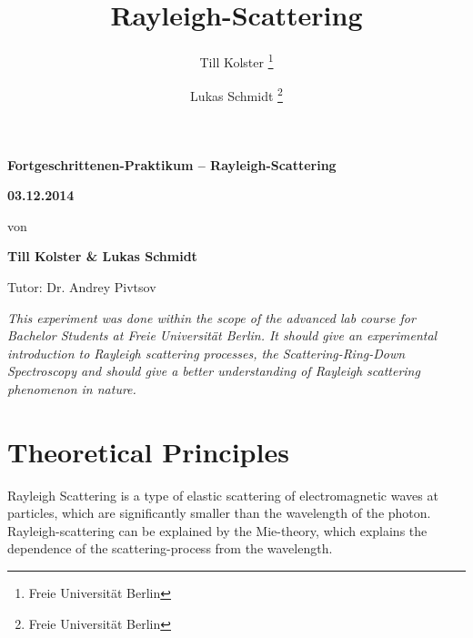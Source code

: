 \documentclass[
	parskip=half,10pt,
	numbers= noenddot, %
	toc=flat, %
	oneside,
	twocolumn,
	]{scrartcl}
\title {Rayleigh-Scattering}
\author {Till Kolster \thanks{Freie Universität Berlin} \and Lukas Schmidt \thanks{Freie Universität Berlin}}
\begin{document}
\begin{titlepage}

\vspace*{-2cm}

\vspace{6cm}
\begin{center}
\huge \bfseries
Fortgeschrittenen-Praktikum -- Rayleigh-Scattering

\vspace{0.5cm}
\large \bfseries
03.12.2014

\vspace{1.5cm}

\large\normalfont von

\bigskip
\textbf{Till Kolster \& Lukas Schmidt}

\bigskip
Tutor: Dr. Andrey Pivtsov

\vspace{3cm}

\parbox{0.8\linewidth}{%
\textit{This experiment was done within the scope of the advanced lab course for Bachelor Students at Freie Universität Berlin.
It should give an experimental introduction to Rayleigh scattering processes, the Scattering-Ring-Down Spectroscopy and should
give a better understanding of Rayleigh scattering phenomenon in nature.
}}


\end{center}
\end{titlepage}


\section{Theoretical Principles}

Rayleigh Scattering is a type of elastic scattering of electromagnetic waves at particles, which are significantly smaller than the wavelength of the photon. 
Rayleigh-scattering can be explained by the Mie-theory, which explains the dependence of the scattering-process from the wavelength. 
\end{document}
